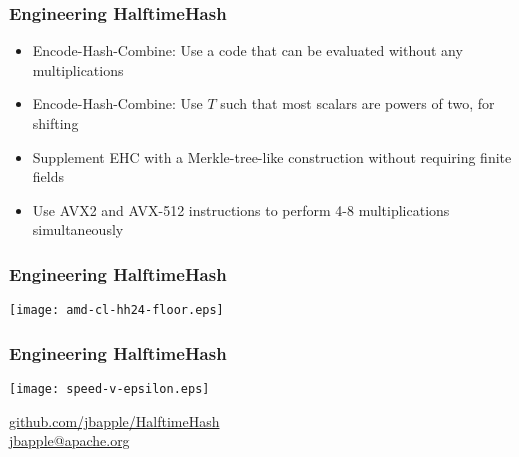 \documentclass[xcolor=dvipsnames]{beamer}
\begin{document}
\begin{frame}

  \frametitle{Engineering HalftimeHash}
  \pause
  \begin{itemize}
  \item Encode{\color{gray}-Hash-Combine}: Use a code that can be evaluated without any multiplications
  \pause
  \item {\color{gray}Encode-Hash-}Combine: Use $T$ such that most scalars are powers of two, for shifting
  \pause
  \item Supplement EHC with a Merkle-tree-like construction without requiring finite fields
  \pause
  \item Use AVX2 and AVX-512 instructions to perform 4-8 multiplications simultaneously
  \end{itemize}
\end{frame}


\begin{frame}
  \frametitle{Engineering HalftimeHash}
  \begin{center}
    \texttt{[image: amd-cl-hh24-floor.eps]}
  \end{center}
\end{frame}

\begin{frame}
  \frametitle{Engineering HalftimeHash}
  \begin{center}
    \texttt{[image: speed-v-epsilon.eps]}
  \end{center}
\end{frame}


\begin{frame}
  \begin{center}
    \href{https://github.com/jbapple/HalftimeHash}{github.com/jbapple/HalftimeHash}
    $ $ \\
    $ $ \\
    \href{mailto:jbapple@apache.org}{\Large jbapple@apache.org}
  \end{center}
\end{frame}
\end{document}
